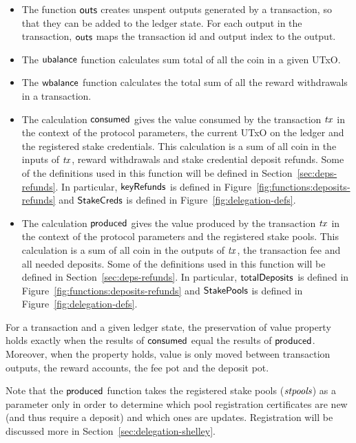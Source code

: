 \begin{itemize}

  \item
    The function $\mathsf{outs}$ creates unspent outputs generated by a transaction, so that
    they can be added to the ledger state.  For each output in the transaction,
    $\mathsf{outs}$ maps the transaction id and output index to the output.

  \item
    The $\mathsf{ubalance}$ function calculates sum total of all the coin in a given UTxO.
  \item
    The $\mathsf{wbalance}$ function calculates the total sum of all the reward withdrawals in a
    transaction.

  \item The calculation $\mathsf{consumed}$ gives the value consumed by the
    transaction $\mathit{tx}$ in the context of the protocol parameters, the
    current UTxO on the ledger and the registered stake credentials. This
    calculation is a sum of all coin in the inputs of $\mathit{tx}$, reward
    withdrawals and stake credential deposit refunds. Some of the definitions
    used in this function will be defined in Section~\ref{sec:deps-refunds}. In
    particular, $\mathsf{keyRefunds}$ is defined in
    Figure~\ref{fig:functions:deposits-refunds} and $\mathsf{StakeCreds}$ is defined in
    Figure~\ref{fig:delegation-defs}.

  \item The calculation $\mathsf{produced}$ gives the value produced by the transaction $\mathit{tx}$
    in the context of the protocol parameters and the registered stake pools.
    This calculation is a sum of all coin in the outputs of $\mathit{tx}$,
    the transaction fee and all needed deposits.
    Some of the definitions used in this function will be defined in
    Section~\ref{sec:deps-refunds}.
    In particular, $\mathsf{totalDeposits}$ is defined in Figure~\ref{fig:functions:deposits-refunds}
    and $\mathsf{StakePools}$ is defined in Figure~\ref{fig:delegation-defs}.
\end{itemize}

For a transaction and a given ledger state, the preservation of value property holds
exactly when the results of $\mathsf{consumed}$ equal the results of $\mathsf{produced}$.
Moreover, when the property holds, value is only moved between transaction outputs,
the reward accounts, the fee pot and the deposit pot.

Note that the $\mathsf{produced}$ function takes the registered stake pools ($\mathit{stpools}$)
as a parameter only in order to determine which pool registration certificates are
new (and thus require a deposit) and which ones are updates.
Registration will be discussed more in Section~\ref{sec:delegation-shelley}.

